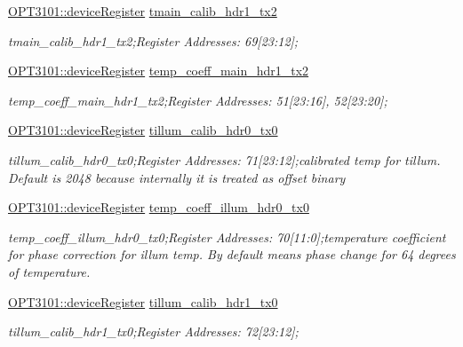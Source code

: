 \begin{DoxyCompactItemize}
\mbox{\hyperlink{class_o_p_t3101_1_1device_register}{O\+P\+T3101\+::device\+Register}} \mbox{\hyperlink{class_o_p_t3101_1_1registers_a755672a04b425f526e780aca79a01183}{tmain\+\_\+calib\+\_\+hdr1\+\_\+tx2}}
\begin{DoxyCompactList}\small\item\em tmain\+\_\+calib\+\_\+hdr1\+\_\+tx2;Register Addresses\+: 69\mbox{[}23\+:12\mbox{]}; \end{DoxyCompactList}\item 
\mbox{\hyperlink{class_o_p_t3101_1_1device_register}{O\+P\+T3101\+::device\+Register}} \mbox{\hyperlink{class_o_p_t3101_1_1registers_a75b5aeda756442dd022a9af3dae14850}{temp\+\_\+coeff\+\_\+main\+\_\+hdr1\+\_\+tx2}}
\begin{DoxyCompactList}\small\item\em temp\+\_\+coeff\+\_\+main\+\_\+hdr1\+\_\+tx2;Register Addresses\+: 51\mbox{[}23\+:16\mbox{]}, 52\mbox{[}23\+:20\mbox{]}; \end{DoxyCompactList}\item 
\mbox{\hyperlink{class_o_p_t3101_1_1device_register}{O\+P\+T3101\+::device\+Register}} \mbox{\hyperlink{class_o_p_t3101_1_1registers_ab99a33d2813594b5b1351e92ea43df6a}{tillum\+\_\+calib\+\_\+hdr0\+\_\+tx0}}
\begin{DoxyCompactList}\small\item\em tillum\+\_\+calib\+\_\+hdr0\+\_\+tx0;Register Addresses\+: 71\mbox{[}23\+:12\mbox{]};calibrated temp for tillum. Default is 2048 because internally it is treated as offset binary \end{DoxyCompactList}\item 
\mbox{\hyperlink{class_o_p_t3101_1_1device_register}{O\+P\+T3101\+::device\+Register}} \mbox{\hyperlink{class_o_p_t3101_1_1registers_ad588b454c66e64ee8b5ecfe608534974}{temp\+\_\+coeff\+\_\+illum\+\_\+hdr0\+\_\+tx0}}
\begin{DoxyCompactList}\small\item\em temp\+\_\+coeff\+\_\+illum\+\_\+hdr0\+\_\+tx0;Register Addresses\+: 70\mbox{[}11\+:0\mbox{]};temperature coefficient for phase correction for illum temp. By default means phase change for 64 degrees of temperature. \end{DoxyCompactList}\item 
\mbox{\hyperlink{class_o_p_t3101_1_1device_register}{O\+P\+T3101\+::device\+Register}} \mbox{\hyperlink{class_o_p_t3101_1_1registers_a0dafe331584ae9d58e692f33e5b7350b}{tillum\+\_\+calib\+\_\+hdr1\+\_\+tx0}}
\begin{DoxyCompactList}\small\item\em tillum\+\_\+calib\+\_\+hdr1\+\_\+tx0;Register Addresses\+: 72\mbox{[}23\+:12\mbox{]}; \end{DoxyCompactList}\item 

\end{DoxyCompactItemize}
